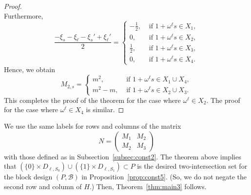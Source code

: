 \documentclass[ALCO,ThmDefs,Unicode]{cedram}
\begin{document}
\begin{proof}
\[\]
Furthermore,
\[
\frac{-\xi_s-\xi_{\ell}-\xi_s'+\xi_{\ell}'}{2}=
\begin{cases}
-\frac{1}{2},& \text{ if } 1+\omega^{\ell} s\in X_1,\\
0,& \text{ if } 1+\omega^{\ell} s\in X_2, \\
\frac{1}{2},& \text{ if }1+\omega^{\ell} s\in X_3,\\
0,& \text{ if } 1+\omega^{\ell} s\in X_4.
\end{cases}
\]
Hence, we obtain
\[
M_{2,s}=
\begin{cases}
m^2,& \text{ if } 1+\omega^\ell s\in X_1 \cup X_4,\\
m^2-m,& \text{ if } 1+\omega^\ell s\in X_2 \cup X_3.
\end{cases}
\]
This completes the proof of the theorem for the case where $\omega^\ell \in X_2$. The proof for the case where $\omega^\ell \in X_4$ is similar.
\end{proof}

We use the same labels for rows and columns of the matrix
\[
N=
\begin{pmatrix} M_1 & M_2 \\
M_2 & M_3
\end{pmatrix}
\]
with those defined as in Subsection~\ref{subsec:const2}. The theorem above implies that $(\{0\}\times D_{\ell,S_0}) \cup (\{1\}\times D_{\ell,S_1})\subset P$ is the desired two-intersection set for the block design $(P,{\mathcal B})$ in Proposition~\ref{prop:const5}. (So, we do not negate the second row and column of $H$.) Then, Theorem~\ref{thm:main3} follows.
\end{document}
